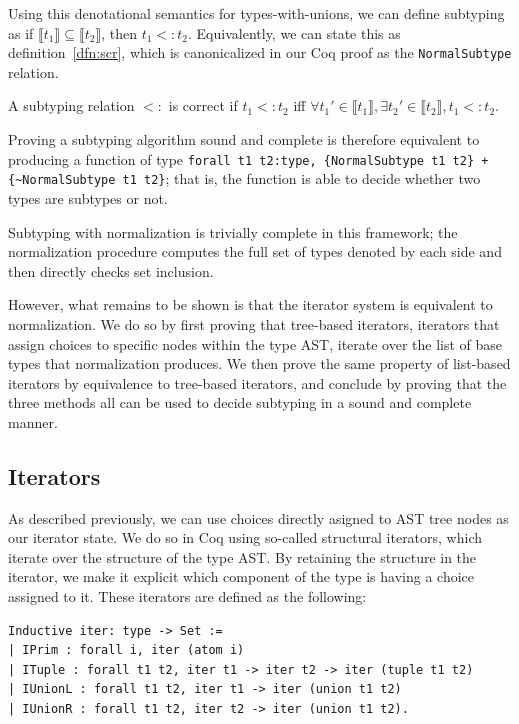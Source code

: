 \documentclass[a4paper,english]{lipics-v2019}
\newcommand{\denotes}[1]{\llbracket #1 \rrbracket}
\begin{document}
Using this denotational semantics for types-with-unions, we can define
subtyping as if $\denotes{t_1} \subseteq \denotes{t_2}$, then $t_1 <: t_2$.
Equivalently, we can state this as definition~\ref{dfn:scr}, which is canonicalized
in our Coq proof as the \verb|NormalSubtype| relation.

\begin{definition}
A subtyping relation $<:$ is correct if $t_1 <: t_2$ iff $\forall t_1' \in \denotes{t_1},
\exists t_2' \in \denotes{t_2}, t_1 <: t_2$.
\label{dfn:scr}
\end{definition}

Proving a subtyping algorithm sound and complete is therefore equivalent to
producing a function of type \verb|forall t1 t2:type, {NormalSubtype t1 t2} + {~NormalSubtype t1 t2}|; 
that is, the function is able to decide whether two types are
subtypes or not.

Subtyping with normalization is trivially complete in this framework; the
normalization procedure computes the full set of types denoted by each side
and then directly checks set inclusion.

However, what remains to be shown is that the iterator system is equivalent to
normalization. We do so by first proving that tree-based iterators, iterators
that assign choices to specific nodes within the type AST, iterate over the
list of base types that normalization produces. We then prove the same
property of list-based iterators by equivalence to tree-based iterators, and
conclude by proving that the three methods all can be used to decide subtyping
in a sound and complete manner.

\subsection{Iterators}

As described previously, we can use choices directly asigned to AST tree nodes
as our iterator state. We do so in Coq using so-called structural iterators,
which iterate over the structure of the type AST. By retaining the structure
in the iterator, we make it explicit which component of the type is having a
choice assigned to it. These iterators are defined as the following:

\begin{small}\begin{verbatim}
Inductive iter: type -> Set :=
| IPrim : forall i, iter (atom i)
| ITuple : forall t1 t2, iter t1 -> iter t2 -> iter (tuple t1 t2)
| IUnionL : forall t1 t2, iter t1 -> iter (union t1 t2)
| IUnionR : forall t1 t2, iter t2 -> iter (union t1 t2).
\end{verbatim}\end{small}
\end{document}

